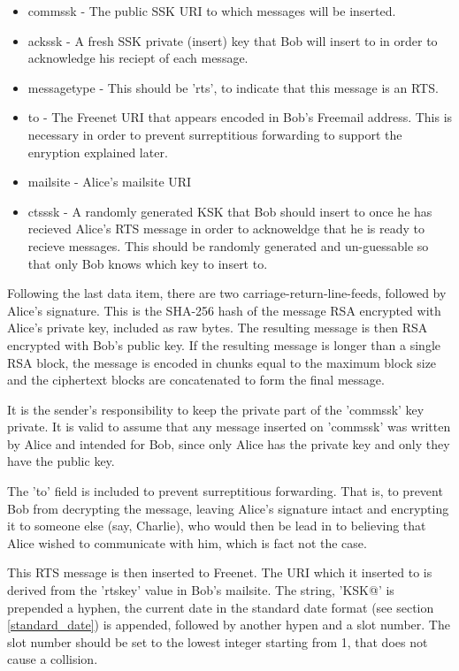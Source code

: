 \documentclass[12pt,a4paper]{article}
\begin{document}
\begin{itemize}
\item commssk - The public SSK URI to which messages will be inserted.
\item ackssk - A fresh SSK private (insert) key that Bob will insert to in order to acknowledge his reciept of each message.
\item messagetype - This should be 'rts', to indicate that this message is an RTS.
\item to - The Freenet URI that appears encoded in Bob's Freemail address. This is necessary in order to prevent surreptitious forwarding to support the enryption explained later.
\item mailsite - Alice's mailsite URI
\item ctsssk - A randomly generated KSK that Bob should insert to once he has recieved Alice's RTS message in order to acknoweldge that he is ready to recieve messages. This should be randomly generated and un-guessable so that only Bob knows which key to insert to.
\end{itemize}

Following the last data item, there are two carriage-return-line-feeds, followed by Alice's signature. This is the SHA-256 hash of the message RSA encrypted with Alice's private key, included as raw bytes. The resulting message is then RSA encrypted with Bob's public key. If the resulting message is longer than a single RSA block, the message is encoded in chunks equal to the maximum block size and the ciphertext blocks are concatenated to form the final message.

It is the sender's responsibility to keep the private part of the 'commssk' key private. It is valid to assume that any message inserted on 'commssk' was written by Alice and intended for Bob, since only Alice has the private key and only they have the public key.

The 'to' field is included to prevent surreptitious forwarding. That is, to prevent Bob from decrypting the message, leaving Alice's signature intact and encrypting it to someone else (say, Charlie), who would then be lead in to believing that Alice wished to communicate with him, which is fact not the case.

This RTS message is then inserted to Freenet. The URI which it inserted to is derived from the 'rtskey' value in Bob's mailsite. The string, 'KSK@' is prepended a hyphen, the current date in the standard date format (see section \ref{standard_date}) is appended, followed by another hypen and a slot number. The slot number should be set to the lowest integer starting from 1, that does not cause a collision.
\end{document}
